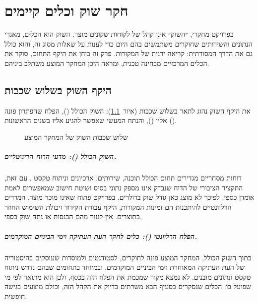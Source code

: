 
\chapter{חקר שוק וכלים קיימים}
\label{ch:market}

בפרויקט מחקרי, ״השוק״ אינו קהל של לקוחות שקונים מוצר. השוק הוא הכלים, מאגרי הנתונים והשירותים שחוקרים משתמשים בהם היום כדי לענות על שאלות מסוג זה, והוא כולל גם את הדרך המסורתית: קריאה ידנית של המקורות. פרק זה בוחן את היקף התחום, סוקר את הכלים המרכזיים מבחינה טכנית, ומראה היכן המחקר המוצע משתלב ביניהם.

\section{היקף השוק בשלוש שכבות}
\label{sec:market-size}

את היקף השוק נהוג לתאר בשלוש שכבות (איור~\ref{fig:market-layers}): השוק הכולל (), הפלח שהפתרון פונה אליו (), והנתח המעשי שאפשר להגיע אליו בשנים הראשונות ().

\begin{figure}[htbp]
  \centering
  
  \caption{שלוש שכבות השוק של המחקר המוצע}
  \label{fig:market-layers}
\end{figure}

\paragraph{השוק הכולל (): מדעי הרוח הדיגיטליים.} דוחות מסחריים מגדירים תחום הכולל תוכנה, שירותים, ארכיונים וניתוח טקסט \cite{fds2026dh}. עם זאת, התקציר הציבורי של הדוח שנבדק אינו מספק נתוני בסיס ושיטת חישוב שמאפשרים לאמת אומדן כספי. לפיכך לא מוצג כאן גודל שוק בדולרים. בפרויקט פתוח שאינו מוכר מוצר, המדדים הרלוונטיים להיתכנות הם זמינות המקורות, היקף עבודת הקידוד ויכולת השימוש החוזר בתוצרים. אין לגזור מהם הכנסות או נתח שוק כספי.

\paragraph{הפלח הרלוונטי (): כלים לחקר העת העתיקה וימי הביניים המוקדמים.} בתוך השוק הכולל, המחקר המוצע פונה לחוקרים, לסטודנטים ולמוסדות שעוסקים בהיסטוריה של העת העתיקה המאוחרת וימי הביניים המוקדמים, ובמיוחד בתחומים שבהם נדרש ניתוח טקסט ונתונים מובנים. לא נמצא מקור שמכמת את הפלח הזה בכסף, ולכן הוא מתואר לפי מי שפועל בו: הכלים שנסקרים בסעיף הבא משרתים בדיוק את הקהל הזה, וכולם מוצעים בגישה חופשית.


